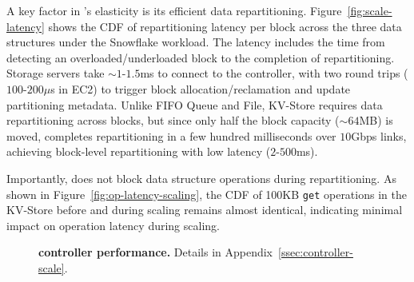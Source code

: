  A key factor in \jiffy’s elasticity is its efficient data repartitioning. Figure~\ref{fig:scale-latency} shows the CDF of repartitioning latency per block across the three data structures under the Snowflake workload. The latency includes the time from detecting an overloaded/underloaded block to the completion of repartitioning. Storage servers take ${\sim}1$-$1.5$ms to connect to the controller, with two round trips ($100$-$200\mu$s in EC2) to trigger block allocation/reclamation and update partitioning metadata. Unlike FIFO Queue and File, KV-Store requires data repartitioning across blocks, but since only half the block capacity (${\sim}64$MB) is moved, \jiffy completes repartitioning in a few hundred milliseconds over $10$Gbps links, achieving block-level repartitioning with low latency ($2$-$500$ms).

Importantly, \jiffy does not block data structure operations during repartitioning. As shown in Figure~\ref{fig:op-latency-scaling}, the CDF of 100KB \texttt{get} operations in the KV-Store before and during scaling remains almost identical, indicating minimal impact on operation latency during scaling.


\begin{figure}[h]
  \centering
  \caption[\jiffy controller performance]{{\textbf{\jiffy controller performance.} Details in Appendix~\ref{ssec:controller-scale}.}}
  \label{fig:controller-perf}
\end{figure}

